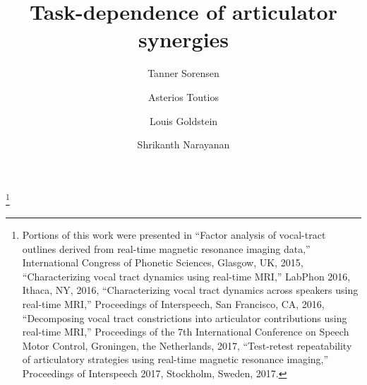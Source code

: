 \documentclass[preprint]{JASAnew}\usepackage[]{graphicx}\usepackage[]{color}
\begin{document}
\title[Task dependence of articulator synergies]{Task-dependence of articulator synergies}

\thanks{Portions of this work were presented in 
``Factor analysis of vocal-tract outlines derived from real-time magnetic resonance imaging data,'' International Congress of Phonetic Sciences, Glasgow, UK, 2015,
``Characterizing vocal tract dynamics using real-time MRI,'' LabPhon 2016, Ithaca, NY, 2016,
``Characterizing vocal tract dynamics across speakers using real-time MRI,'' Proceedings of Interspeech, San Francisco, CA, 2016, 
``Decomposing vocal tract constrictions into articulator contributions using real-time MRI,'' Proceedings of the 7th International Conference on Speech Motor Control, Groningen, the Netherlands, 2017,
``Test-retest repeatability of articulatory strategies using real-time magnetic resonance imaging,'' Proceedings of Interspeech 2017, Stockholm, Sweden, 2017.}

\author{Tanner Sorensen}

\author{Asterios Toutios}

\author{Louis Goldstein}

\author{Shrikanth Narayanan}
\end{document}

